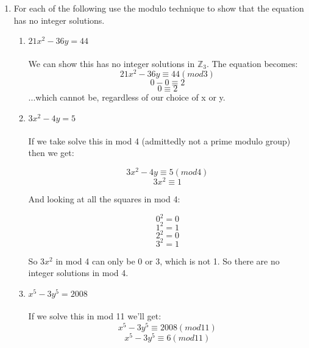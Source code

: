 
\usepackage{amsmath, amssymb, dsfont}

\newenvironment{amatrix}[1]{%
  \left(\begin{array}{@{}*{#1}{c}|c@{}}
}{%
  \end{array}\right)
}

\makeatletter
\renewcommand*\env@matrix[1][*\c@MaxMatrixCols c]{%
  \hskip -\arraycolsep
  \let\@ifnextchar\new@ifnextchar
  \array{#1}}
\makeatother

\newcommand{\?}{\stackrel{?}{=}}



\pagestyle{myheadings}

\begin{enumerate}
  \item For each of the following use the modulo technique to show that the equation has no integer solutions.
    \begin{enumerate}
    \item $21x^2 - 36y = 44$\\\\
    
    We can show this has no integer solutions in $\mathds{Z}_3$. The equation becomes:
        $$21x^2 - 36y \equiv 44 (mod 3)$$
        $$0 - 0 \equiv 2$$
        $$0 \equiv 2$$
    ...which cannot be, regardless of our choice of x or y.\\
    
    \item $3x^2 - 4y = 5$\\\\
    
    If we take solve this in mod 4 (admittedly not a prime modulo group) then we get:
    
    $$3x^2 - 4y \equiv 5 (mod 4)$$
    $$3x^2 \equiv 1$$
    
    And looking at all the squares in mod 4:
    
    $$0^2 = 0$$
    $$1^2 = 1$$
    $$2^2 = 0$$
    $$3^2 = 1$$
    
    So $3x^2$ in mod 4 can only be $0$ or $3$, which is not 1. So there are no integer solutions in mod 4.
    
    
    \item $x^5 - 3y^5 = 2008$\\\\
    
    If we solve this in mod 11 we'll get:
    $$x^5 - 3y^5 \equiv 2008 (mod 11)$$
    $$x^5 - 3y^5 \equiv 6 (mod 11)$$
    

\end{enumerate}
\end{enumerate}
